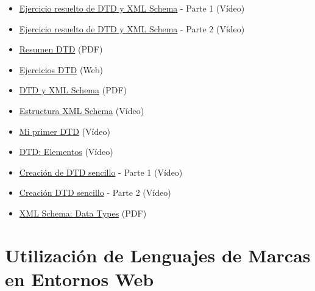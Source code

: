 \begin{itemize}
    \item  \href{https://www.youtube.com/watch?v=1qFhBPkQqEM&ab_channel=PepeLluyot}{Ejercicio resuelto de DTD y XML Schema} - Parte 1 (Vídeo)
    \item  \href{https://www.youtube.com/watch?v=m1dmbNjbeZA&ab_channel=PepeLluyot}{Ejercicio resuelto de DTD y XML Schema} - Parte 2 (Vídeo)
    \item  \href{https://educacionadistancia.juntadeandalucia.es/formacionprofesional/pluginfile.php/36335/mod_scorm/content/33/ResumenDTD.pdf}{Resumen DTD} (PDF)
    \item \href{https://www.mclibre.org/consultar/xml/ejercicios/dtd.html}{Ejercicios DTD} (Web)
    \item \href{https://educacionadistancia.juntadeandalucia.es/formacionprofesional/pluginfile.php/36335/mod_scorm/content/33/DTD_SCHEMA.pdf}{DTD y XML Schema} (PDF)
    \item \href{https://www.youtube.com/watch?v=JKhfLpkVh3o&ab_channel=Introducci%C3%B3naXML%28iXML%29}{Estructura XML Schema} (Vídeo)
    \item \href{https://www.youtube.com/watch?v=EfnWCeQNTQI&ab_channel=Introducci%C3%B3naXML%28iXML%29}{Mi primer DTD} (Vídeo)
    \item \href{https://www.youtube.com/watch?v=ryoW-B_6cGs&ab_channel=LoboTecnoKu}{DTD: Elementos} (Vídeo)
    \item \href{https://www.youtube.com/watch?v=fPU1ex7bSgg&ab_channel=LoboTecnoKu}{Creación de DTD sencillo} - Parte 1 (Vídeo)
    \item   \href{https://www.youtube.com/watch?v=4NB89iXyxMU&ab_channel=LoboTecnoKu}{Creación DTD sencillo} - Parte 2 (Vídeo)
    \item \href{https://educacionadistancia.juntadeandalucia.es/formacionprofesional/pluginfile.php/36335/mod_scorm/content/33/SchemaDataTypesQR-2.pdf}{XML Schema: Data Types} (PDF)
\end{itemize}

\chapter{Utilización de Lenguajes de Marcas en Entornos Web}



\glsaddall
\printglossaries


\newpage
{}



